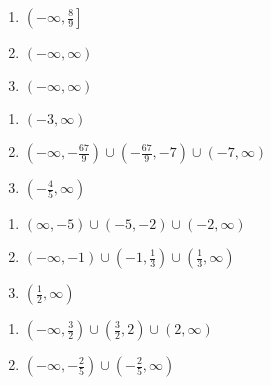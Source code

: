\begin{multicols}{3}
\begin{enumerate}	\setcounter{enumi}{\value{Review}}
	\item $\left(-\infty, \frac{8}{9}\right]$
	\item $(-\infty, \infty)$
    \item $(-\infty, \infty)$
\end{enumerate}	\setcounter{Review}{\value{enumi}}
\end{multicols}
\begin{multicols}{3}
\begin{enumerate}	\setcounter{enumi}{\value{Review}}
    \item $(-3, \infty)$
    \item $\left(-\infty,-\frac{67}{9}\right) \cup \left(-\frac{67}{9},-7\right) \cup (-7,\infty)$
    \item $\left(-\frac{4}{5}, \infty\right)$
\end{enumerate}	\setcounter{Review}{\value{enumi}}
\end{multicols}
\begin{multicols}{3}
\begin{enumerate}	\setcounter{enumi}{\value{Review}}
    \item $(\infty,-5) \cup (-5,-2) \cup (-2,\infty)$
    \item $(-\infty, -1) \cup (-1, \frac{1}{3}) \cup (\frac{1}{3}, \infty)$
    \item $(\frac{1}{2}, \infty)$
\end{enumerate}	\setcounter{Review}{\value{enumi}}
\end{multicols}
\begin{multicols}{3}
\begin{enumerate}	\setcounter{enumi}{\value{Review}}
    \item $\left(-\infty, \frac{3}{2}\right) \cup \left(\frac{3}{2}, 2\right) \cup (2, \infty)$
    \item $\left(-\infty, -\frac{2}{5}\right) \cup \left(-\frac{2}{5}, \infty\right)$
\end{enumerate}
\end{multicols}

